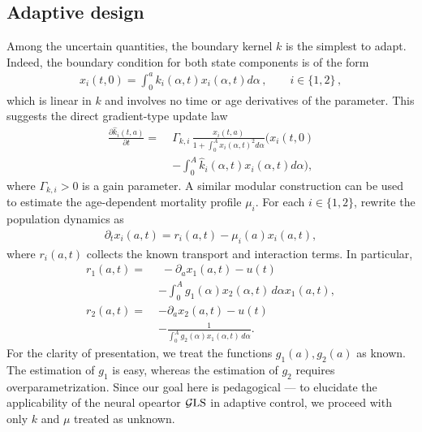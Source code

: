 \documentclass[journal,twoside,web]{ieeecolor}
\begin{document}
\subsection{Adaptive design} \label{subsec-adaptive-design}
Among the uncertain quantities, the boundary kernel $k$ is the simplest to adapt. Indeed, the boundary condition for both state components is of the form
\begin{align}
x_i(t,0)= \int_0^a k_i(\alpha, t) x_i(\alpha, t)d \alpha\,, \qquad i \in \{1, 2\}\,,
\end{align}
which is linear in $k$ and involves no time or age derivatives of the parameter. This suggests the direct gradient-type update law
\begin{align} %
\frac{\partial \hat{k}_i(t,a)}{\partial t}
=\;& \nonumber 
\Gamma_{k, i}\,  \frac{x_i(t,a)}{1 + \int_0^A x_i(\alpha, t)^2d\alpha}\Bigg(x_i(t,0) \\ &-  \int_0^A \hat{k}_i(\alpha, t) x_i(\alpha, t) d\alpha\Big), \label{eq:khat-update}
\end{align}
where $\Gamma_{k, i} > 0$ is a gain parameter.
A similar modular construction can be used to estimate the age-dependent mortality profile $\mu_i$. For each $i\in\{1,2\}$, rewrite the population dynamics as
\begin{align}
\label{eq-mu-parametrization}
\partial_t x_i(a,t)=r_i(a,t)-\mu_i(a)x_i(a,t),
\end{align}
where $r_i(a,t)$ collects the known transport and interaction terms. In particular,
\begin{align}
r_1(a,t)=\;&\;-\partial_a x_1(a,t)-u(t)\nonumber \\ &-\int_0^A g_1(\alpha)x_2(\alpha,t)\,d\alpha x_1(a,t),\\
r_2(a,t)=\;&-\partial_a x_2(a,t)-u(t) \nonumber \\ &-\frac{1}{\int_0^A g_2(\alpha)x_1(\alpha,t)\,d\alpha}.
\end{align}
For the clarity of presentation, we treat the functions $g_1(a), g_2(a)$ as known. The estimation of $g_1$ is easy, whereas the estimation of $g_2$ requires overparametrization. Since our goal here is pedagogical --- to elucidate the applicability of the neural opeartor $\mathcal{G}{\rm LS}$ in adaptive control, we proceed with only $k$ and $\mu $ treated as unknown.
\end{document}
